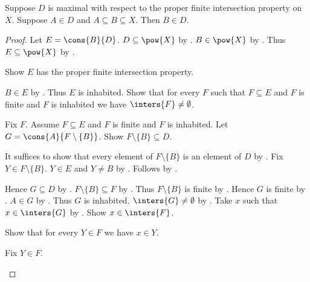 \begin{lemma}\label{maximal_proper_fip_contains_supersets}
    Suppose $D$ is maximal with respect to the proper finite intersection property on $X$.
    Suppose $A\in D$ and $A\subseteq B\subseteq X$.
    Then $B\in D$.
\end{lemma}
\begin{proof}
    Let $E=\cons{B}{D}$.
    $D\subseteq\pow{X}$ by
        .
    $B\in\pow{X}$ by .
    Thus $E\subseteq\pow{X}$ by .

    Show $E$ has the proper finite intersection property.
    \begin{subproof}
        $B\in E$ by .
        Thus $E$ is inhabited.
        Show that for every $F$ such that $F\subseteq E$ and $F$ is finite
            and $F$ is inhabited we have $\inters{F}\neq\emptyset$.
        \begin{subproof}
            Fix $F$.
            Assume $F\subseteq E$ and $F$ is finite and $F$ is inhabited.
            Let $G=\cons{A}{F\setminus\{B\}}$.
            Show $F\setminus\{B\}\subseteq D$.
            \begin{subproof}
                It suffices to show that every element of $F\setminus\{B\}$
                    is an element of $D$ by .
                Fix $Y\in F\setminus\{B\}$.
                $Y\in E$ and $Y\neq B$ by
                    .
                Follows by .
            \end{subproof}
            Hence $G\subseteq D$ by .
            $F\setminus\{B\}\subseteq F$ by .
            Thus $F\setminus\{B\}$ is finite
                by .
            Hence $G$ is finite by .
            $A\in G$ by .
            Thus $G$ is inhabited.
            $\inters{G}\neq\emptyset$ by
                .
            Take $x$ such that $x\in\inters{G}$ by .
            Show $x\in\inters{F}$.
            \begin{subproof}
                Show that for every $Y\in F$ we have $x\in Y$.
                \begin{subproof}
                    Fix $Y\in F$.
                    \begin{byCase}

\end{byCase}
\end{subproof}
\end{subproof}
\end{subproof}
\end{subproof}
\end{proof}
